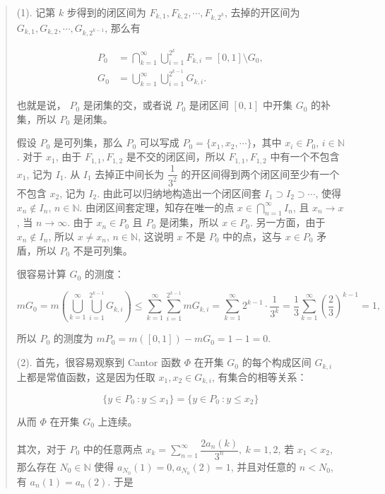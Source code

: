 \documentclass[
]{article}
\begin{document}
\begin{quote}
(1). 记第 \(k\) 步得到的闭区间为
\(F_{k, 1}, F_{k, 2}, \cdots, F_{k, 2^k}\), 去掉的开区间为
\(G_{k, 1}, G_{k, 2}, \cdots, G_{k, 2^{k-1}}\), 那么有

\[\begin{aligned}
P_0 & = \bigcap\limits_{k=1}^{\infty} \bigcup\limits_{i=1}^{2^k} F_{k, i} = [0, 1] \setminus G_0, \\
G_0 & = \bigcup\limits_{k=1}^{\infty} \bigcup\limits_{i=1}^{2^{k-1}} G_{k, i}.
\end{aligned}\]

也就是说， \(P_0\) 是闭集的交，或者说 \(P_0\) 是闭区间 \([0, 1]\) 中开集
\(G_0\) 的补集，所以 \(P_0\) 是闭集。

假设 \(P_0\) 是可列集，那么 \(P_0\) 可以写成
\(P_0 = \{ x_1, x_2, \cdots \}\)，其中 \(x_i \in P_0\),
\(i \in \mathbb{N}\). 对于 \(x_1\), 由于 \(F_{1, 1}, F_{1, 2}\)
是不交的闭区间，所以 \(F_{1, 1}, F_{1, 2}\) 中有一个不包含 \(x_1\), 记为
\(I_1\). 从 \(I_1\) 去掉正中间长为 \(\dfrac{1}{3^2}\)
的开区间得到两个闭区间至少有一个不包含 \(x_2\), 记为 \(I_2\).
由此可以归纳地构造出一个闭区间套 \(I_1 \supset I_2 \supset \cdots\),
使得 \(x_n \notin I_n\), \(n \in \mathbb{N}\).
由闭区间套定理，知存在唯一的点
\(x \in \bigcap\limits_{n=1}^{\infty} I_n\), 且 \(x_n \to x\), 当
\(n \to \infty\). 由于 \(x_n \in P_0\) 且 \(P_0\) 是闭集，所以
\(x \in P_0\). 另一方面，由于 \(x_n \notin I_n\), 所以 \(x \neq x_n\),
\(n \in \mathbb{N}\), 这说明 \(x\) 不是 \(P_0\) 中的点，这与
\(x \in P_0\) 矛盾，所以 \(P_0\) 不是可列集。

很容易计算 \(G_0\) 的测度：

\[m G_0 = m \left( \bigcup\limits_{k=1}^{\infty} \bigcup\limits_{i=1}^{2^{k-1}} G_{k, i} \right) \leqslant \sum\limits_{k=1}^{\infty} \sum\limits_{i=1}^{2^{k-1}} m G_{k, i} = \sum\limits_{k=1}^{\infty} 2^{k-1} \cdot \dfrac{1}{3^k} = \dfrac{1}{3} \sum\limits_{k=1}^{\infty} \left( \dfrac{2}{3} \right)^{k-1} = 1,\]

所以 \(P_0\) 的测度为 \(m P_0 = m ([0, 1]) - m G_0 = 1 - 1 = 0\).

(2). 首先，很容易观察到 Cantor 函数 \(\Phi\) 在开集 \(G_0\)
的每个构成区间 \(G_{k, i}\) 上都是常值函数，这是因为任取
\(x_1, x_2 \in G_{k, i}\), 有集合的相等关系：

\[\{y \in P_0 ~ \colon y \leqslant x_1\} = \{y \in P_0 ~ \colon y \leqslant x_2\}\]

从而 \(\Phi\) 在开集 \(G_0\) 上连续。

其次，对于 \(P_0\) 中的任意两点
\(x_k = \displaystyle \sum\limits_{n=1}^{\infty} \dfrac{2a_n(k)}{3^n}, ~ k = 1, 2\),
若 \(x_1 < x_2\), 那么存在 \(N_0 \in \mathbb{N}\) 使得
\(a_{N_0}(1) = 0, a_{N_0}(2) = 1\), 并且对任意的 \(n < N_0\), 有
\(a_n(1) = a_n(2)\). 于是


\end{quote}
\end{document}
